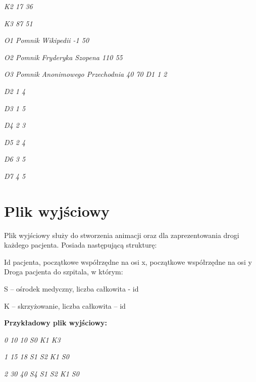 ﻿\documentclass{article}
\begin{document}
\noindent \textit{K2 {\textbar} 17 {\textbar} 36}

\noindent \textit{K3 {\textbar} 87 {\textbar} 51}

\noindent \textit{O1 {\textbar} Pomnik Wikipedii {\textbar} -1 {\textbar} 50}

\noindent \textit{O2 {\textbar} Pomnik Fryderyka Szopena {\textbar} 110 {\textbar} 55}

\noindent \textit{O3 {\textbar} Pomnik Anonimowego Przechodnia {\textbar} 40 {\textbar} 70}
\noindent \textit{D1 {\textbar} 1 {\textbar} 2}

\noindent \textit{D2 {\textbar} 1 {\textbar} 4}

\noindent \textit{D3 {\textbar} 1 {\textbar} 5}

\noindent \textit{D4 {\textbar} 2 {\textbar} 3}

\noindent \textit{D5 {\textbar} 2 {\textbar} 4}

\noindent \textit{D6 {\textbar} 3 {\textbar} 5}

\noindent \textit{D7 {\textbar} 4 {\textbar} 5}

\noindent 
\section{Plik wyj\'{s}ciowy}

\noindent Plik wyj\'{s}ciowy s{\l}u\.{z}y do stworzenia animacji oraz dla zaprezentowania drogi ka\.{z}dego pacjenta. Posiada nast\k{e}puj\k{a}c\k{a} struktur\k{e}:

\noindent {}

\noindent Id pacjenta, pocz\k{a}tkowe wsp\'{o}{\l}rz\k{e}dne na osi x, pocz\k{a}tkowe wsp\'{o}{\l}rz\k{e}dne na osi y {\textbar} Droga pacjenta do szpitala, w kt\'{o}rym:

\noindent {}

\noindent S -- o\'{s}rodek medyczny, liczba ca{\l}kowita - id

\noindent K -- skrzy\.{z}owanie, liczba ca{\l}kowita -- id

\noindent {}

\noindent \textbf {Przyk{\l}adowy plik wyj\'{s}ciowy:}

\noindent {}

\noindent \textit {0 10 10 {\textbar} S0 K1 K3 }

\noindent \textit {1 15 18 {\textbar} S1 S2 K1 S0 }

\noindent \textit {2 30 40 {\textbar} S4 S1 S2 K1 S0 }

\noindent 
\end{document}
